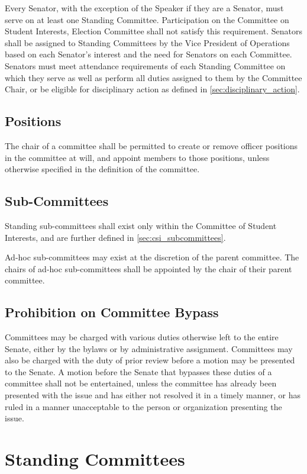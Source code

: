 \documentclass[12pt]{scrreprt}
\begin{document}
Every Senator, with the exception of the Speaker if they are a Senator, must serve on at least one Standing Committee. Participation on the Committee on Student Interests, Election Committee shall not satisfy this requirement. 
Senators shall be assigned to Standing Committees by the Vice President of Operations based on each Senator’s interest and the need for Senators on each Committee. Senators must meet attendance requirements of each Standing Committee on which they serve as well as perform all duties assigned to them by the Committee Chair, or be eligible for disciplinary action as defined in \ref{sec:disciplinary_action}.

\section{Positions}
The chair of a committee shall be permitted to create or remove officer 
positions in the committee at will, and appoint members to those positions, 
unless otherwise specified in the definition of the committee.

\section{Sub-Committees}
Standing sub-committees shall exist only within the Committee of Student 
Interests, and are further defined in \ref{sec:csi_subcommittees}.

Ad-hoc sub-committees may exist at the discretion of the parent committee. The 
chairs of ad-hoc sub-committees shall be appointed by the chair of their 
parent committee.

\section{Prohibition on Committee Bypass}
Committees may be charged with various duties otherwise left to the entire 
Senate, either by the bylaws or by administrative assignment. Committees may 
also be charged with the duty of prior review before a motion may be presented 
to the Senate. A motion before the Senate that bypasses these duties of a 
committee shall not be entertained, unless the committee has already been 
presented with the issue and has either not resolved it in a timely manner, or 
has ruled in a manner unacceptable to the person or organization presenting 
the issue.

\chapter{Standing Committees}
\end{document}

